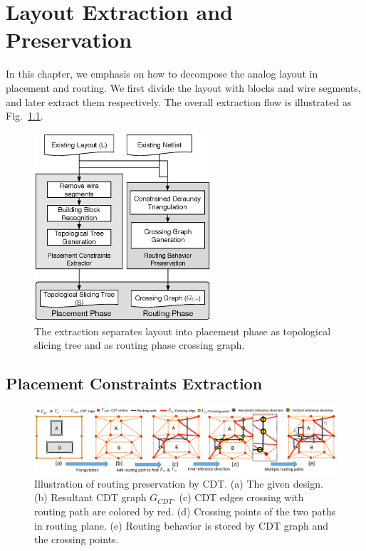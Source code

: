 
\chapter{Layout Extraction and Preservation}\label{chap:LayoutExtPre}

  In this chapter, we emphasis on how to decompose the analog layout in placement and routing. We first divide the layout with blocks and wire segments, and later extract them respectively. The overall extraction flow is illustrated as Fig.~\ref{fig:ExtractFlow}. 

  \begin{figure}[t]
    \centering
    \includegraphics[height=7cm]{Fig/ExtractFlow.eps}
    \caption{The extraction separates layout into placement phase as topological slicing tree and as routing phase crossing graph.}
    \label{fig:ExtractFlow}
  \end{figure}


  \section{Placement Constraints Extraction}\label{subsec:PlExtract}

    \begin{figure}[t]
      \begin{center}
      \includegraphics[width=\textwidth]{Fig/CGC.eps}
      \caption{Illustration of routing preservation by CDT. 
        (a) The given design.
        (b) Resultant CDT graph $G_{CDT}$.
        (c) CDT edges crossing with routing path are colored by red.
        (d) Crossing points of the two paths in routing plane.
        (e) Routing behavior is stored by CDT graph and the crossing points.}
      \label{fig:CGC}
      \end{center}
    \end{figure}

